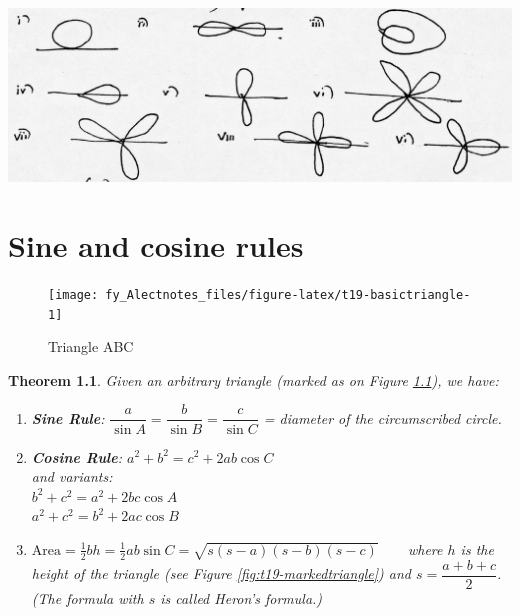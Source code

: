 \documentclass[
  12pt,
  oneside]{book}
\newtheorem{theorem}{Theorem}[chapter]
\theoremstyle{definition}
\theoremstyle{definition}
\theoremstyle{definition}
\theoremstyle{definition}
\theoremstyle{remark}
\begin{document}
\begin{center}\includegraphics{t17-curves} \end{center}

\chapter{Sine and cosine rules}\label{sine-and-cosine-rules}

\begin{figure}

{\centering \texttt{[image: fy\_Alectnotes\_files/figure-latex/t19-basictriangle-1]} 

}

\caption{Triangle ABC}\label{fig:t19-basictriangle}
\end{figure}

\begin{theorem}

Given an arbitrary triangle (marked as on Figure \ref{fig:t19-basictriangle}), we have:

\begin{enumerate}
\def\labelenumi{\arabic{enumi}.}
\item
  \textbf{Sine Rule}: \(\boxed{\dfrac{a}{\sin A} = \dfrac{b}{\sin B} = \dfrac{c}{\sin C}}\) = diameter of the circumscribed circle.
\item
  \textbf{Cosine Rule}: \(\boxed{a^2+b^2 = c^2 + 2ab\cos C}\)\\
  and variants:\\
  \(b^2+c^2 = a^2 + 2bc\cos A\)\\
  \(a^2+c^2 = b^2 + 2ac\cos B\)
\item
  \(\boxed{\mathrm{Area} = \frac12 bh = \frac12ab\sin C = \sqrt{s(s-a)(s-b)(s-c)}}\) ~ ~ where \(h\) is the \emph{height} of the triangle (see Figure \ref{fig:t19-markedtriangle}) and \(s=\dfrac{a+b+c}{2}\).\\
  (The formula with \(s\) is called \emph{Heron's formula}.)
\end{enumerate}

\end{theorem}
\end{document}
